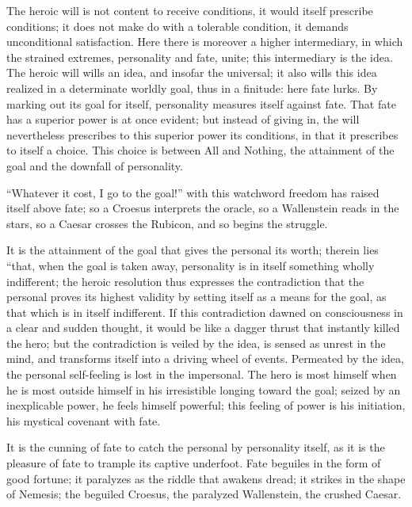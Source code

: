 \documentclass[12pt,a4paper,openany]{book}
\newcommand{\opage}[1]{\marginnote{\footnotesize\textit{[#1]}}}
\begin{document}
The heroic will is not content to receive
conditions, it would itself prescribe conditions;
it does not make do with a tolerable
\setcounter{footnote}{0}%
\opage{14}condition, it demands unconditional satisfaction.
Here there is moreover a higher intermediary, in which
the strained extremes, personality and fate,
unite; this intermediary is the idea.
The heroic will wills an idea, and insofar
the universal; it also wills this idea realized
in a determinate worldly goal, thus in a
finitude: here fate lurks. By marking out
its goal for itself, personality measures itself
against fate. That fate has a superior power
is at once evident; but instead of giving in,
the will nevertheless prescribes to this superior power
its conditions, in that it prescribes to itself a
choice. This choice is between All and Nothing,
the attainment of the goal and the downfall of personality.

``Whatever it cost, I go to the
goal!'' with this watchword freedom has raised
itself above fate; so a Croesus interprets the oracle,
so a Wallenstein reads in the stars, so
a Caesar crosses the Rubicon, and so begins
the struggle.

It is the attainment of the goal that gives the
personal its worth; therein lies ``that, when
the goal is taken away, personality is in itself
\setcounter{footnote}{0}%
\opage{15}something wholly indifferent; the heroic resolution
thus expresses the contradiction that the
personal proves its highest validity by
setting itself as a means for the goal, as that which is in
itself indifferent. If this contradiction
dawned on consciousness in a clear and sudden
thought, it would be like a dagger thrust
that instantly killed the hero; but the contradiction
is veiled by the idea, is sensed as unrest in the mind, and transforms itself into a driving wheel
of events. Permeated by the idea, the
personal self-feeling is lost in the impersonal.
The hero is most himself when he is
most outside himself in his irresistible
longing toward the goal; seized by an inexplicable
power, he feels himself powerful; this feeling of power
is his initiation, his mystical covenant with
fate.

It is the cunning of fate to catch the personal
by personality itself, as it is
the pleasure of fate to trample its captive underfoot.
Fate beguiles in the form of good fortune; it paralyzes
as the riddle that awakens dread; it strikes
in the shape of Nemesis; the beguiled Croesus,
the paralyzed Wallenstein, the crushed Caesar.
\end{document}
